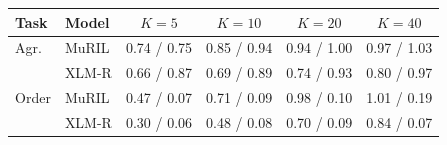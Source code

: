 \begin{tabular}{@{}llcccc@{}}
\toprule
Task & Model & $K=5$ & $K=10$ & $K=20$ & $K=40$ \\
\midrule
Agr. & MuRIL & 0.74 / 0.75 & 0.85 / 0.94 & 0.94 / 1.00 & 0.97 / 1.03 \\
 & XLM-R & 0.66 / 0.87 & 0.69 / 0.89 & 0.74 / 0.93 & 0.80 / 0.97 \\
Order & MuRIL & 0.47 / 0.07 & 0.71 / 0.09 & 0.98 / 0.10 & 1.01 / 0.19 \\
 & XLM-R & 0.30 / 0.06 & 0.48 / 0.08 & 0.70 / 0.09 & 0.84 / 0.07 \\
\bottomrule
\end{tabular}

